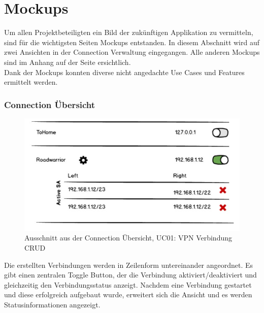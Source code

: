 \section{Mockups}
Um allen Projektbeteiligten ein Bild der zukünftigen Applikation zu vermitteln, sind für die wichtigsten Seiten Mockups entstanden. In diesem Abschnitt wird auf zwei Ansichten in der Connection Verwaltung eingegangen. Alle anderen Mockups sind im Anhang auf der Seite \pageref{Mockups} ersichtlich.\\
Dank der Mockups konnten  diverse nicht angedachte Use Cases und Features ermittelt werden.
\subsubsection{Connection Übersicht}
\begin{figure}[H]
	\centering
	\includegraphics[width=330pt]{images/mockups/short_con_overview.jpg}
	\caption{Ausschnitt aus der Connection Übersicht,  UC01: VPN Verbindung CRUD}
\end{figure}
\medskip
Die erstellten Verbindungen werden in Zeilenform untereinander angeordnet. Es gibt einen zentralen Toggle Button, der die Verbindung aktiviert/deaktiviert und gleichzeitig den Verbindungsstatus anzeigt. 
Nachdem eine Verbindung gestartet und diese erfolgreich aufgebaut wurde, erweitert sich die Ansicht und es werden Statusinformationen angezeigt.
    
